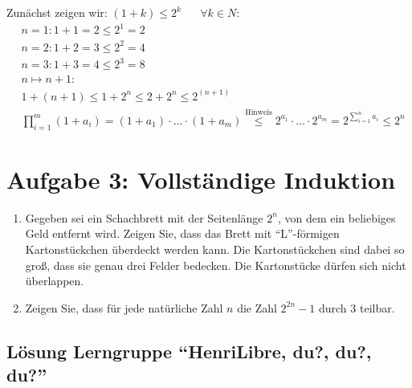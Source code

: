 \documentclass[12pt,a4paper]{report}
\begin{document}
	Zunächst zeigen wir: $ (1+k) \leq 2^k $ ~~ $ \forall k \in N$:
	\begin{align*} 
	&n = 1:  1 + 1 = 2 \leq 2^1 = 2\\
	&n = 2:  1 + 2 = 3 \leq 2^2 = 4\\
	&n = 3:  1 + 3 = 4 \leq 2^3 = 8\\
	&n \mapsto n+1:\\
	&1+(n+1) \leq 1+2^n \leq 2+2^n \leq 2^{(n+1)}\\
	&\prod^m_{i=1}(1+a_i)=(1+a_1)\cdot\ldots\cdot (1+a_m) \overset{\text{Hinweis}}{\leq}  2^{a_1}\cdot\ldots\cdot 2^{a_m} = 2^{\sum^{n}_{i=1}a_i} \leq 2^n
	\end{align*}
	
\section{Aufgabe 3: Vollständige Induktion}
\begin{enumerate}
	\item Gegeben sei ein Schachbrett mit der Seitenlänge $2^n$, von dem ein beliebiges Geld entfernt wird. Zeigen Sie, dass das Brett mit \enquote{L}-förmigen Kartonstückchen überdeckt werden kann. Die Kartonstückchen sind dabei so groß, dass sie genau drei Felder bedecken. Die Kartonstücke dürfen sich nicht überlappen.
	\item Zeigen Sie, dass für jede natürliche Zahl $n$ die Zahl $2^{2n}-1$ durch $3$ teilbar.
\end{enumerate}

\subsection{Lösung Lerngruppe \enquote{HenriLibre, du?, du?, du?}}
\end{document}
